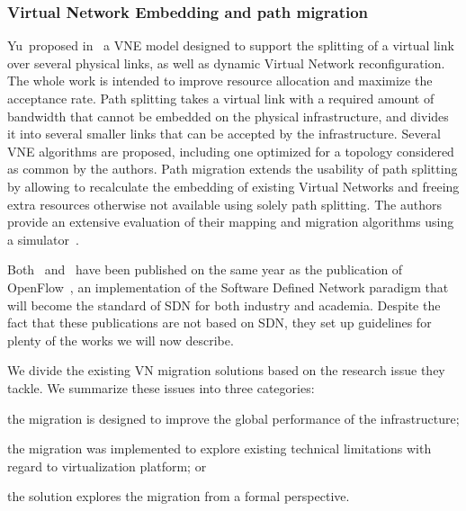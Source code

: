\subsubsection{Virtual Network Embedding and path migration}
Yu~\etal proposed in~\cite{VNE-Yu2008} a VNE model designed to support the splitting of a virtual link over several physical links, as well as dynamic Virtual Network reconfiguration.
The whole work is intended to improve resource allocation and maximize the acceptance rate. 
Path splitting takes a virtual link with a required amount of bandwidth that cannot be embedded on the physical infrastructure, and divides it into several smaller links that can be accepted by the infrastructure.
Several VNE algorithms are proposed, including one optimized for a topology considered as common by the authors.
Path migration extends the usability of path splitting by allowing to recalculate the embedding of existing Virtual Networks and freeing extra resources otherwise not available using solely path splitting.
The authors provide an extensive evaluation of their mapping and migration algorithms using a simulator~\cite{vnesimulator}.

Both~\cite{VROOM-Wang2008} and~\cite{VNE-Yu2008} have been published on the same year as the publication of OpenFlow~\cite{Openflow-McKeown2008}, an implementation of the Software Defined Network paradigm that will become the standard of SDN for both industry and academia.
Despite the fact that these publications are not based on SDN, they set up guidelines for plenty of the works we will now describe.

We divide the existing VN migration solutions based on the research issue they tackle.
We summarize these issues into three categories: 
\begin{inparaenum}[i)] 
\item the migration is designed to improve the global performance of the infrastructure;
\item the migration was implemented to explore existing technical limitations with regard to virtualization platform; or 
\item the solution explores the migration from a formal perspective.
\end{inparaenum}

